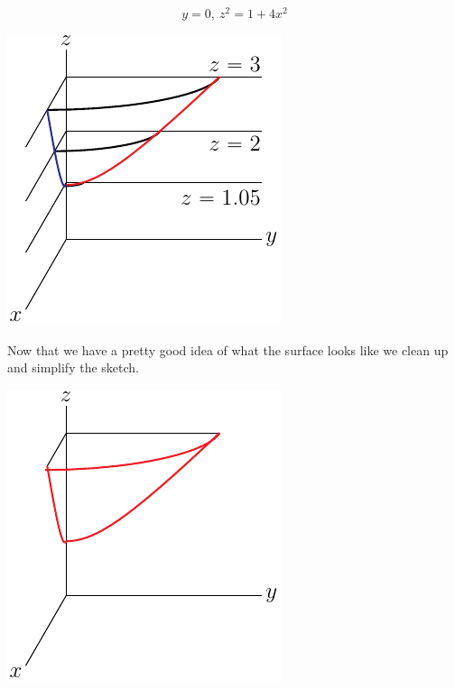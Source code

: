 \begin{eg}[$4x^2+y^2-z^2=-1$]
\begin{equation*}
y=0,\ z^2=1+4x^2
\end{equation*}
\begin{efig}
\begin{center}
   \includegraphics{hyperboloidBaa.pdf}
\end{center}
\end{efig}
Now that we have a pretty good idea of what the surface looks like
we clean up and simplify the sketch.
\begin{efig}
\begin{center}
   \includegraphics{hyperboloidCC.pdf}\qquad\qquad

\end{center}
\end{efig}
\end{eg}

